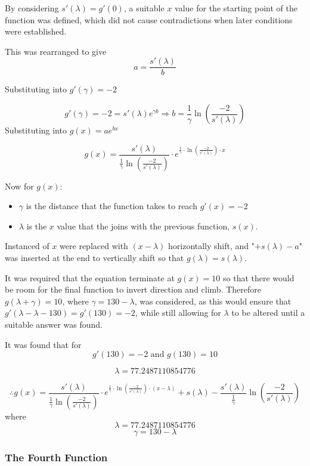 \documentclass[11pt, letterpaper]{article}
\begin{document}
	

By considering $s'(\lambda)=g'(0)$, a suitable $x$ value for the starting point of the function was defined, which did not cause contradictions when later conditions were established. 

This was rearranged to give $$a=\frac{s'(\lambda)}{b}$$

Substituting into $g'(\gamma)=-2$
 
 $$g'(\gamma)=-2=s'(\lambda)e^{\gamma b}\Rightarrow 
 b=\frac{1}{\gamma}\ln(\frac{-2}{s'(\lambda)})$$ Substituting into $g(x)=ae^{bx}$

 $$g(x)=\frac{s'(\lambda)}{\frac{1}{\gamma}\ln(\frac{-2}{s'(\lambda)})}\cdot e^{\frac{1}{\gamma}\cdot \ln (\frac{-2}{s'(\lambda)})\cdot x}$$ 
 
 Now for $g(x)$:
 \begin{itemize}
 	\item $\gamma$ is the distance that the function takes to reach $g'(x)=-2$
 	\item $\lambda$ is the $x$ value that the joins with the previous function, $s(x)$.
 \end{itemize}
		

Instanced of $x$ were replaced with $(x-\lambda)$ horizontally shift, and "$+s(\lambda)-a$" was inserted at the end to vertically shift so that $g(\lambda)=s(\lambda)$.
		

It was required that the equation terminate at $g(x)=10$ so that there would be room for the final function to invert direction and climb. Therefore $g(\lambda + \gamma)=10$, where $\gamma=130-\lambda$, was considered, as this would ensure that $g'(\lambda-\lambda-130)=g'(130)=-2$, while still allowing for $\lambda$ to be altered until a suitable answer was found.
		

It was found that for 
$$g'(130)=-2 \textrm{ and } g(130)=10$$ 

$$\lambda=77.2487110854776$$ 

$$\therefore g(x)=\frac{s'(\lambda)}{\frac{1}{\gamma}\ln(\frac{-2}{s'(\lambda)})}\cdot e^{\frac{1}{\gamma}\cdot \ln (\frac{-2}{s'(\lambda)})\cdot (x-\lambda)}+s\left(\lambda\right)-\frac{s'(\lambda)}{\frac{1}{\gamma}}\ln\left(\frac{-2}{s'\left(\lambda\right)}\right)$$ where $$\lambda=77.2487110854776$$
$$\gamma=130-\lambda$$





\subsubsection{The Fourth Function}
\end{document}
